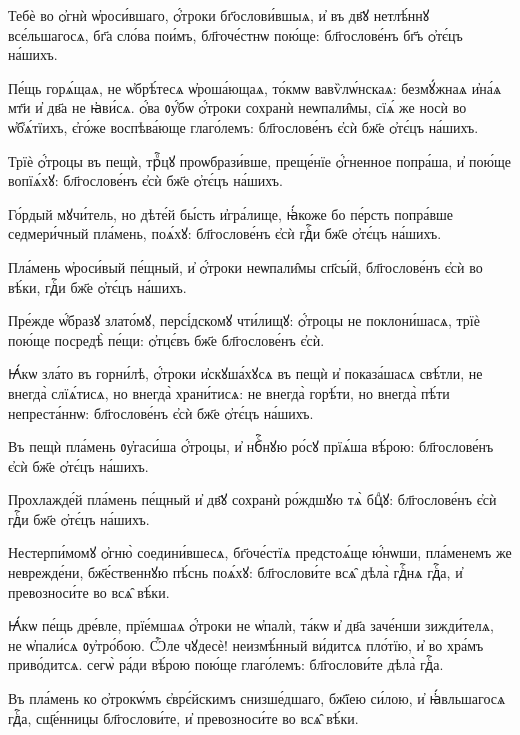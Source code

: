 \hKv Тебѐ во ѻ҆гнѝ ѡ҆роси́вшаго, ѻ҆́троки  бг҃ослови́вшыѧ, и҆ въ дв҃ꙋ нетлѣ́ннꙋ все́льшагосѧ, бг҃а  сло́ва пои́мъ, бл҃гоче́стнѡ пою́ще: бл҃гослове́нъ бг҃ъ  ѻ҆тє́цъ на́шихъ. 

\hKv Пе́щь горѧ́щаѧ, не ѡ҆брѣ́тесѧ ѡ҆роша́ющаѧ, то́кмѡ  вавѷлѡ́нскаѧ: безмꙋ́жнаѧ и҆на́ѧ мт҃и  и҆ дв҃а не ꙗ҆ви́сѧ. ѻ҆́ва ᲂу҆́бѡ ѻ҆́троки  сохранѝ неѡпали̑мы, сїѧ́ же носѝ во ѡ҆б̾ѧ́тїихъ, є҆го́же  воспѣва́юще глаго́лемъ: бл҃гослове́нъ є҆сѝ бж҃е ѻ҆тє́цъ  на́шихъ. 
%

\hKv Трїѐ ѻ҆́троцы въ пещѝ, трⷪ҇цꙋ проѡбрази́вше, преще́нїе  ѻ҆́гненное попра́ша, и҆ пою́ще вопїѧ́хꙋ: бл҃гослове́нъ  є҆сѝ бж҃е ѻ҆тє́цъ на́шихъ. 

\hKv Го́рдый мꙋчи́тель, но дѣте́й бы́сть и҆гра́лище, ꙗ҆́коже бо  пе́рсть попра́вше седмери́чный пла́мень, поѧ́хꙋ:  бл҃гослове́нъ є҆сѝ гдⷭ҇и бж҃е ѻ҆тє́цъ на́шихъ. 
%

\hKv Пла́мень ѡ҆роси́вый пе́щный, и҆ ѻ҆́троки неѡпали̑мы  сп҃сы́й, бл҃гослове́нъ є҆сѝ во вѣ́ки, гдⷭ҇и бж҃е  ѻ҆тє́цъ на́шихъ. 

\hKv Пре́жде ѡ҆́бразꙋ злато́мꙋ, персі́дскомꙋ чти́лищꙋ: ѻ҆́троцы  не поклони́шасѧ, трїѐ пою́ще посредѣ̀ пе́щи: ѻ҆тцє́въ  бж҃е бл҃гослове́нъ є҆сѝ.  

\hKv Ꙗ҆́кѡ зла́то въ горни́лѣ, ѻ҆́троки и҆скꙋша́хꙋсѧ въ пещѝ  и҆ показа́шасѧ свѣ́тли, не внегда̀ слїѧ́тисѧ, но внегда̀  храни́тисѧ: не внегда̀ горѣ́ти, но внегда̀ пѣ́ти  непреста́ннѡ: бл҃гослове́нъ є҆сѝ бж҃е ѻ҆тє́цъ на́шихъ. 

\hKv Въ пещѝ пла́мень ᲂу҆гаси́ша ѻ҆́троцы, и҆ нбⷭ҇нꙋю ро́сꙋ  прїѧ́ша вѣ́рою: бл҃гослове́нъ є҆сѝ бж҃е ѻ҆тє́цъ  на́шихъ. 

\hKv Прохлажде́й пла́мень пе́щный и҆ дв҃ꙋ сохранѝ ро́ждшꙋю тѧ̀  бцⷣꙋ: бл҃гослове́нъ є҆сѝ гдⷭ҇и бж҃е ѻ҆тє́цъ на́шихъ. 
%


\hKv Нестерпи́момꙋ ѻ҆гню̀ соедини́вшесѧ,  бг҃оче́стїѧ предстоѧ́ще ю҆́нѡши, пла́менемъ же неврежде́ни,  бж҃е́ственнꙋю пѣ́снь поѧ́хꙋ: бл҃гослови́те всѧ̑ дѣла̀  гдⷭ҇нѧ гдⷭ҇а, и҆ превозноси́те во всѧ̑ вѣ́ки. 

\hKv Ꙗ҆́кѡ пе́щь дре́вле, прїе́мшаѧ ѻ҆́троки не ѡ҆палѝ, та́кѡ  и҆ дв҃а заче́нши зижди́телѧ,   не ѡ҆пали́сѧ ᲂу҆тро́бою. Ѽле чꙋдесѐ! неизмѣ́нный  ви́дитсѧ пло́тїю, и҆ во хра́мъ приво́дитсѧ. сегѡ̀ ра́ди  вѣ́рою пою́ще глаго́лемъ: бл҃гослови́те дѣла̀ гдⷭ҇а. 
%

\hKv Въ пла́мень ко ѻ҆трокѡ́мъ є҆врє́йскимъ снизше́дшаго,  бж҃їею си́лою, и҆ ꙗ҆́вльшагосѧ гдⷭ҇а, сщ҃е́нницы  бл҃гослови́те, и҆ превозноси́те во всѧ̑ вѣ́ки. 

